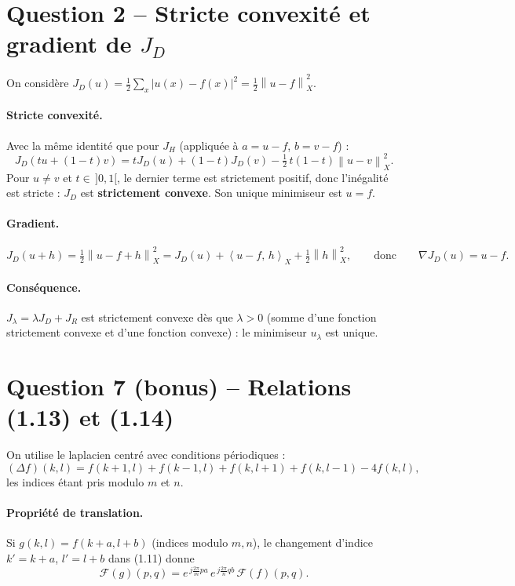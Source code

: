 \documentclass[11pt,a4paper]{article}
\newcommand{\X}{X}
\newcommand{\ps}[2]{\left\langle #1,\, #2 \right\rangle}
\newcommand{\nr}[1]{\left\| #1 \right\|}
\newcommand{\F}{\mathcal{F}}
\begin{document}
\section*{Question 2 -- Stricte convexité et gradient de $J_D$}

On considère $J_D(u) = \frac12\sum_x |u(x)-f(x)|^2 = \frac12\nr{u-f}_\X^2$.

\paragraph{Stricte convexité.}
Avec la même identité que pour $J_H$ (appliquée à $a = u-f$, $b = v-f$) :
\[
  J_D(tu+(1-t)v) = t J_D(u) + (1-t) J_D(v) - \tfrac12\,t(1-t)\nr{u-v}_\X^2 .
\]
Pour $u\neq v$ et $t\in\,]0,1[$, le dernier terme est strictement positif, donc l'inégalité est stricte :
$J_D$ est \textbf{strictement convexe}. Son unique minimiseur est $u=f$.

\paragraph{Gradient.}
\[
  J_D(u+h) = \tfrac12\nr{u-f+h}_\X^2 = J_D(u) + \ps{u-f}{h}_\X + \tfrac12\nr{h}_\X^2,
  \qquad\text{donc}\qquad
  \boxed{\nabla J_D(u) = u - f.}
\]

\paragraph{Conséquence.}
$J_\lambda = \lambda J_D + J_R$ est strictement convexe dès que $\lambda>0$ (somme d'une fonction strictement
convexe et d'une fonction convexe) : le minimiseur $u_\lambda$ est unique.

\section*{Question 7 (bonus) -- Relations (1.13) et (1.14)}

On utilise le laplacien centré avec conditions périodiques :
\[
  (\Delta f)(k,l) = f(k+1,l) + f(k-1,l) + f(k,l+1) + f(k,l-1) - 4 f(k,l),
\]
les indices étant pris modulo $m$ et $n$.

\paragraph{Propriété de translation.}
Si $g(k,l) = f(k+a,l+b)$ (indices modulo $m,n$), le changement d'indice $k' = k+a$, $l'=l+b$ dans (1.11) donne
\[
  \F(g)(p,q) = e^{\,j\frac{2\pi}{m}pa}\, e^{\,j\frac{2\pi}{n}qb}\, \F(f)(p,q).
\]
\end{document}

